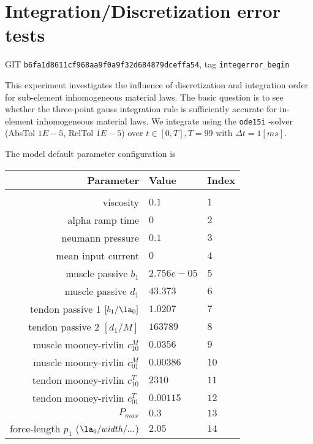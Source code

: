 \section{Integration/Discretization error tests}
GIT \texttt{b6fa1d8611cf968aa9f0a9f32d684879dceffa54}, tag \texttt{integerror\_begin}

This experiment investigates the influence of discretization and integration order for sub-element inhomogeneous material laws.
The basic question is to see whether the three-point gauss integration rule is sufficiently accurate for in-element inhomogeneous material laws.
We integrate using the \texttt{ode15i} \ML-solver (AbsTol $1E-5$, RelTol $1E-5$) over $t\in[0,T], T=99$ with $\Delta t = 1 [ms]$. 

The model default parameter configuration is
\begin{table}[!hb]
	\centering
	\def\arraystretch{1.3}
	\begin{tabular}{rll}
		Parameter 				& Value		& Index\\
		\hline\\
		viscosity				& $0.1$		& $1$\\
		alpha ramp time			& $0$		& $2$\\
		neumann pressure			& $0.1$		& $3$\\
		mean input current			& $0$		& $4$\\
		muscle passive $b_1$			& $2.756e-05$	& $5$\\
		muscle passive $d_1$			& $43.373$	& $6$\\
		tendon passive 1 $[b_1/\la_0]$		& $1.0207$	& $7$\\
		tendon passive 2 $[d_1/M]$			& $163789$	& $8$\\
		muscle mooney-rivlin $c^M_{10}$		& $0.0356$	& $9$\\
		muscle mooney-rivlin $c^M_{01}$		& $0.00386$	& $10$\\
		tendon mooney-rivlin $c^T_{10}$		& $2310$	& $11$\\
		tendon mooney-rivlin $c^T_{01}$		& $0.00115$	& $12$\\
		$P_{max}$					& $0.3$		& $13$\\
		force-length $p_1$ ($\la_0/width/...$)	& $2.05$	& $14$\\
	\end{tabular}
\end{table}
